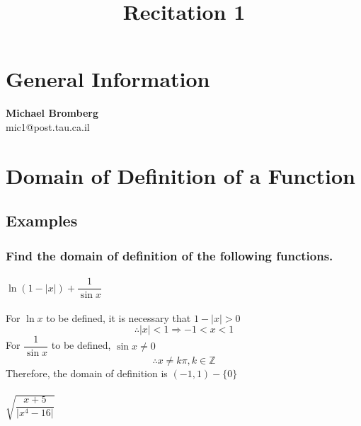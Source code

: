 \documentclass[fleqn]{article}
\title{Recitation 1}
\author{}
\date{\formatdate{29}{10}{2014}}
\begin{document}
\maketitle
\setlength{\mathindent}{0pt}

\tableofcontents

\newpage
\section{General Information}

\textbf{Michael Bromberg}\\
mic1@post.tau.ca.il\\

\newpage
\section{Domain of Definition of a Function}

\subsection{Examples}

\subsubsection{Find the domain of definition of the following functions.}

\paragraph{$\ln (1 - \lvert x \rvert) + \dfrac{1}{\sin x}$\\}

For $\ln x$ to be defined, it is necessary that $1 - \lvert x \rvert > 0$ \\
\begin{equation*}
	\therefore \lvert x \rvert < 1 \Rightarrow -1 < x < 1 
\end{equation*}
For $\dfrac{1}{\sin x}$ to be defined, $\sin x \neq 0$\\
\begin{equation*}
	\therefore x \neq k\pi, k \in \mathbb{Z}
\end{equation*}
Therefore, the domain of definition is $(-1,1) - \{0\}$

\paragraph{$\sqrt{\dfrac{x+5}{\lvert	x^4 - 16	\rvert}}$\\}
\end{document}
